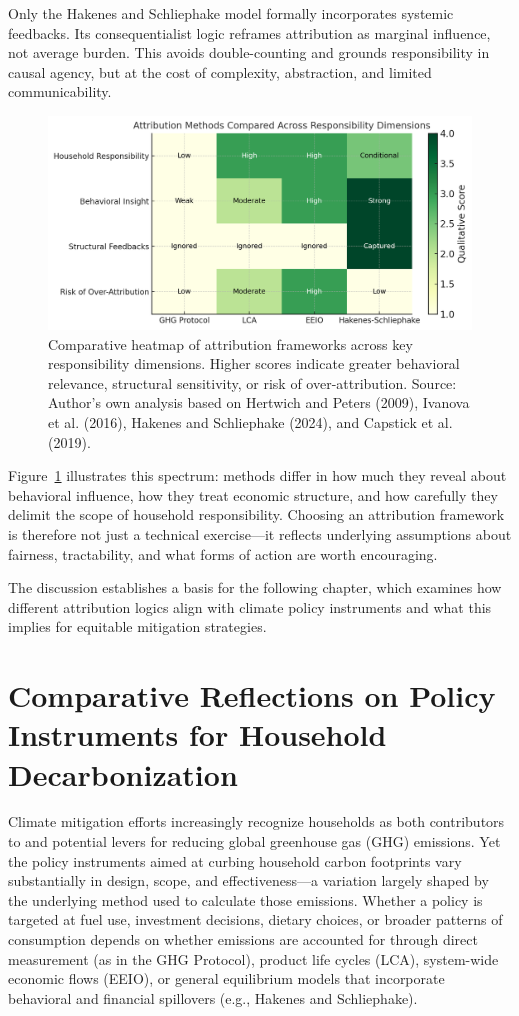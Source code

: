 \documentclass[12pt,a4paper]{article}%
\begin{document}
Only the Hakenes and Schliephake model formally incorporates systemic feedbacks. Its consequentialist logic reframes attribution as marginal influence, not average burden. This avoids double-counting and grounds responsibility in causal agency, but at the cost of complexity, abstraction, and limited communicability.
\begin{figure}[h]
    \centering
    \includegraphics[width=\textwidth]{Heatmap Res.png}
    \caption{\small{Comparative heatmap of attribution frameworks across key responsibility dimensions. Higher scores indicate greater behavioral relevance, structural sensitivity, or risk of over-attribution. Source: Author's own analysis based on Hertwich and Peters (2009), Ivanova et al. (2016), Hakenes and Schliephake (2024), and Capstick et al. (2019).}}\label{fig:heatmap}
\end{figure}
Figure~\ref{fig:heatmap} illustrates this spectrum: methods differ in how much they reveal about behavioral influence, how they treat economic structure, and how carefully they delimit the scope of household responsibility. Choosing an attribution framework is therefore not just a technical exercise—it reflects underlying assumptions about fairness, tractability, and what forms of action are worth encouraging.



\noindent
The discussion establishes a basis for the following chapter, which examines how different attribution logics align with climate policy instruments and what this implies for equitable mitigation strategies.
\section{Comparative Reflections on Policy Instruments for Household Decarbonization}

Climate mitigation efforts increasingly recognize households as both contributors to and potential levers for reducing global greenhouse gas (GHG) emissions. Yet the policy instruments aimed at curbing household carbon footprints vary substantially in design, scope, and effectiveness—a variation largely shaped by the underlying method used to calculate those emissions. Whether a policy is targeted at fuel use, investment decisions, dietary choices, or broader patterns of consumption depends on whether emissions are accounted for through direct measurement (as in the GHG Protocol), product life cycles (LCA), system-wide economic flows (EEIO), or general equilibrium models that incorporate behavioral and financial spillovers (e.g., Hakenes and Schliephake).
\end{document}
